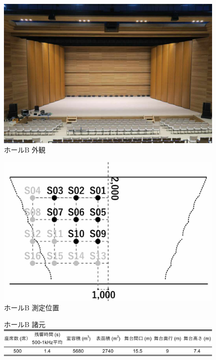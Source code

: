 \documentclass[11pt,a4j]{jreport}
\begin{document}
\newpage
\begin{figure}[H]
  \begin{minipage}{.5\linewidth} %
    \centering
    \includegraphics[width=.7\linewidth]{images/measuredHalls/resized/picture_b.jpg}
    \\ホールB 外観
  \end{minipage}%
  \begin{minipage}{.5\linewidth} %
    \centering
    \includegraphics[width=.7\linewidth]{images/measuredHalls/resized/flat_b.jpg}
    \\ホールB 測定位置
  \end{minipage}

  \begin{minipage}{1\linewidth}
    \centering
    ホールB 諸元\\
    \includegraphics[width=.8\linewidth]{images/measuredHalls/informationTable/b.pdf}
  \end{minipage}
\end{figure}
\end{document}
